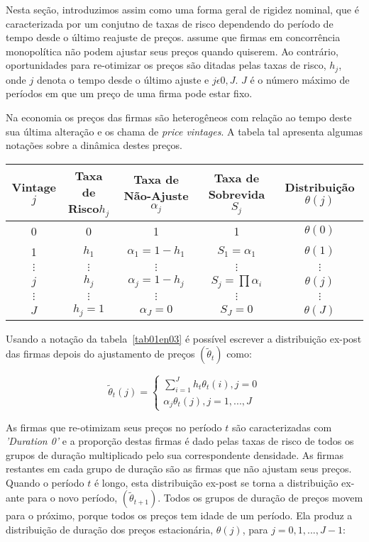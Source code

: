 \documentclass[twoside,a4paper,11pt]{report}
\begin{document}
Nesta seção, introduzimos assim como \citet{yao2010aggregate} uma forma geral de rigidez nominal, que é caracterizada por um conjutno de taxas de risco dependendo do período de tempo desde o último reajuste de preços. \citet{yao2010aggregate} assume que firmas em concorrência monopolítica não podem ajustar seus preços quando quiserem. Ao contrário, oportunidades para re-otimizar os preços são ditadas pelas taxas de risco, $h_{j}$, onde $j$ denota o tempo desde o último ajuste e $j\epsilon {0,J}$. $J$ é o número máximo de períodos em que um preço de uma firma pode estar fixo. 

Na economia os preços das firmas são heterogêneos com relação ao tempo deste sua última alteração e \citet{yao2010aggregate} os chama de \emph{price vintages}. A tabela tal apresenta algumas notações sobre a dinâmica destes preços. 

\begin{center}\label{tab01en03}
  \begin{tabular}{|c|c|c|c|c|}
    \hline 
    Vintage$j$ & Taxa de Risco$h_{j}$ & Taxa de Não-Ajuste $\alpha_{j}$ & Taxa de Sobrevida $S_{j}$ & Distribuição $\theta(j)$\tabularnewline
    \hline 
    0 & 0 & 1 & 1 & $\theta(0)$\tabularnewline
    \hline 
    1 & $h_{1}$ & $\alpha_{1}=1-h_{1}$ & $S_{1}=\alpha_{1}$ & $\theta(1)$\tabularnewline
    \hline 
    $\vdots$ & $\vdots$ & $\vdots$ & $\vdots$ & $\vdots$\tabularnewline
    \hline 
    $j$ & $h_{j}$ & $\alpha_{j}=1-h_{j}$ & $S_{j}=\prod\alpha_{i}$ & $\theta(j)$\tabularnewline
    \hline 
    $\vdots$ & $\vdots$ & $\vdots$ & $\vdots$ & $\vdots$\tabularnewline
    \hline 
    $J$ & $h_{j}=1$ & $\alpha_{J}=0$ & $S_{J}=0$ & $\theta(J)$\tabularnewline
    \hline 
  \end{tabular}
\end{center}

Usando a notação da tabela~\ref{tab01en03} é possível escrever a distribuição ex-post das firmas depois do ajustamento de preços $({\tilde{\theta}}_{t})$ como:

\begin{equation}\label{eq14en03}
{\tilde{\theta}}_{t}(j)=\begin{cases} \sum _{i=1}^{J}{{h}_{t}{\theta}_{t}(i)} ,j=0 \\ {\alpha}_{j}{\theta}_{t}(j),j=1,...,J \end{cases}
\end{equation}

As firmas que re-otimizam seus preços no período $t$ são caracterizadas com \emph{'Duration 0'} e a proporção destas firmas é dado pelas taxas de risco de todos os grupos de duração multiplicado pelo sua correspondente densidade. As firmas restantes em cada grupo de duração são as firmas que não ajustam seus preços. Quando o período $t$ é longo, esta distribuição ex-post se torna a distribuição ex-ante para o novo período, $({\tilde{\theta}}_{t+1})$. Todos os grupos de duração de preços movem para o próximo, porque todos os preços tem idade de um período. Ela produz a distribuição de duração dos preços estacionária, ${\theta}(j)$, para $j=0,1,...,J-1$:
\end{document}
